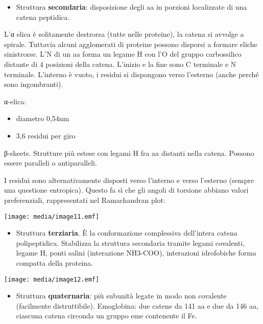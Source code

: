 \begin{itemize}
\item
  Struttura \textbf{secondaria}: disposizione degli aa in porzioni
  localizzate di una catena peptidica.
\end{itemize}

L'α elica è solitamente destrorsa (tutte nelle proteine), la catena si
avvolge a spirale. Tuttavia alcuni agglomerati di proteine possono
disporsi a formare eliche sinistrorse. L'N di un aa forma un legame H
con l'O del gruppo carbossilico distante di 4 posizioni della catena.
L'inizio e la fine sono C terminale e N terminale. L'interno è vuoto, i
residui si dispongono verso l'esterno (anche perché sono ingombranti).

α-elica:

\begin{itemize}
\item
  diametro 0,54nm
\item
  3,6 residui per giro
\end{itemize}

β-sheets. Strutture più estese con legami H fra aa distanti nella
catena. Possono essere paralleli o antiparalleli.

I residui sono alternativamente disposti verso l'interno e verso
l'esterno (sempre una questione entropica). Questo fa sì che gli angoli
di torsione abbiano valori preferenziali, rappresentati nel Ramachandran
plot:

\texttt{[image: media/image11.emf]}

\begin{itemize}
\item
  Struttura \textbf{terziaria}. È la conformazione complessiva
  dell'intera catena polipeptidica. Stabilizza la struttura secondaria
  tramite legami covalenti, legame H, ponti salini (interazione
  NH3-COO), interazioni idrofobiche forma compatta della proteina.
\end{itemize}

\texttt{[image: media/image12.emf]}

\begin{itemize}
\item
  Struttura \textbf{quaternaria}: più subunità legate in modo non
  covalente (facilmente distruttibile). Emoglobina: due catene da 141 aa
  e due da 146 aa, ciascuna catena circonda un gruppo eme contenente il
  Fe.
\end{itemize}

